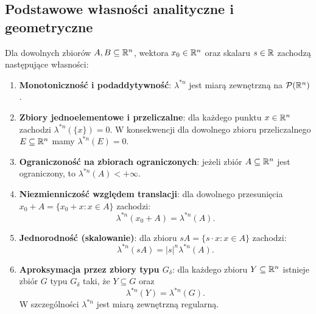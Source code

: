 \subsection{Podstawowe własności analityczne i geometryczne}
\begin{tw}\label{tw:wlasnosci_zewn}
    Dla dowolnych zbiorów $A, B \subseteq \mathbb{R}^{n}$, wektora $x_0 \in \mathbb{R}^{n}$ oraz skalaru $s \in \mathbb{R}$ zachodzą następujące własności:
    \begin{enumerate}
        \item \textbf{Monotoniczność i podaddytywność}: $\lambda^{*n}$ jest miarą zewnętrzną na $\mathcal{P}(\mathbb{R}^{n})$.
        \item \textbf{Zbiory jednoelementowe i przeliczalne}: dla każdego punktu $x \in \mathbb{R}^{n}$ zachodzi $\lambda^{*n}(\{x\}) = 0$. W konsekwencji dla dowolnego zbioru przeliczalnego $E \subseteq \mathbb{R}^{n}$ mamy $\lambda^{*n}(E) = 0$.
        \item \textbf{Ograniczoność na zbiorach ograniczonych}: jeżeli zbiór $A \subseteq \mathbb{R}^{n}$ jest ograniczony, to $\lambda^{*n}(A) < +\infty$.

        \item \textbf{Niezmienniczość względem translacji}: dla dowolnego przesunięcia $x_0 + A = \{x_0 + x \colon x \in A\}$ zachodzi:
              \begin{equation*}
                  \lambda^{*n}(x_0 + A) = \lambda^{*n}(A).
              \end{equation*}
        \item \textbf{Jednorodność (skalowanie)}: dla zbioru $sA = \{s \cdot x \colon x \in A\}$ zachodzi:
              \begin{equation*}
                  \lambda^{*n}(sA) = |s|^n \lambda^{*n}(A).
              \end{equation*}
        \item \textbf{Aproksymacja przez zbiory typu $G_\delta$}: dla każdego zbioru $Y \subseteq \mathbb{R}^{n}$ istnieje zbiór $G$ typu $G_\delta$ taki, że $Y \subseteq G$ oraz
              \begin{equation*}
                  \lambda^{*n}(Y) = \lambda^{*n}(G).
              \end{equation*}
              W szczególności $\lambda^{*n}$ jest miarą zewnętrzną regularną. \end{enumerate}
\end{tw}

